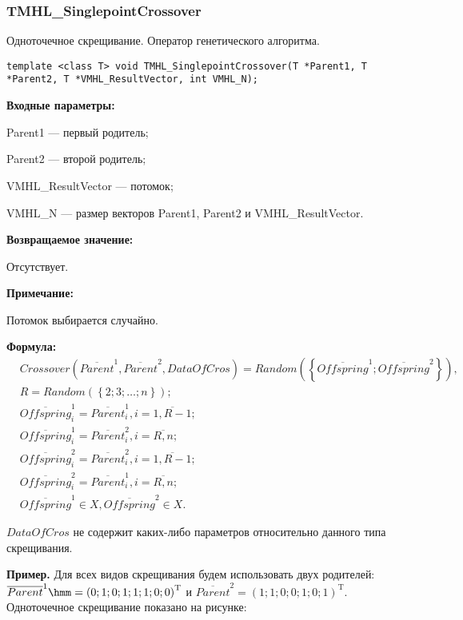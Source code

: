 \documentclass[a4paper,12pt]{article}
\begin{document}
\subsubsection{TMHL\_SinglepointCrossover}\label{TMHL_SinglepointCrossover}

Одноточечное скрещивание. Оператор генетического алгоритма.


\begin{lstlisting}[label=code_syntax_TMHL_SinglepointCrossover,caption=Синтаксис]
template <class T> void TMHL_SinglepointCrossover(T *Parent1, T *Parent2, T *VMHL_ResultVector, int VMHL_N);
\end{lstlisting}

\textbf{Входные параметры:}
 
Parent1 --- первый родитель;
 
Parent2 --- второй родитель;
 
VMHL\_ResultVector --- потомок;
 
VMHL\_N --- размер векторов Parent1, Parent2 и VMHL\_ResultVector.

\textbf{Возвращаемое значение:}

 Отсутствует.
 
\textbf{ Примечание:}

 Потомок выбирается случайно.
 
 \textbf{Формула:}
\begin{align}
&Crossover \left( \overline{Parent}^1, \overline{Parent}^2, DataOfCros\right)=Random \left(\left\lbrace \overline{Offspring}^1; \overline{Offspring}^2\right\rbrace  \right), \nonumber\\
&R=Random\left( \left\lbrace 2; 3; \ldots; n\right\rbrace \right); \nonumber \\
& \overline{Offspring}^1_i=\overline{Parent}^1_i, i=\overline{1,R-1};\nonumber\\
&  \overline{Offspring}^1_i=\overline{Parent}^2_i, i=\overline{R,n};\nonumber\\
&\overline{Offspring}^2_i=\overline{Parent}^2_i, i=\overline{1,R-1};\nonumber\\
& \overline{Offspring}^2_i=\overline{Parent}^1_i, i=\overline{R,n};\nonumber\\
&\overline{Offspring}^1\in X, \overline{Offspring}^2\in X.\nonumber
\end{align}

$ DataOfCros $ не содержит каких-либо параметров относительно данного типа скрещивания.

\textbf{Пример.} Для всех видов скрещивания будем использовать двух родителей: $\overline{Parent}^1\hmm={\left( 0; 1; 0; 1; 1; 1; 0; 0\right)}^\mathrm{T}  $ и $\overline{Parent}^2={\left( 1; 1; 0; 0; 1; 0; 1\right)}^\mathrm{T}  $. Одноточечное скрещивание показано на рисунке:
\end{document}
